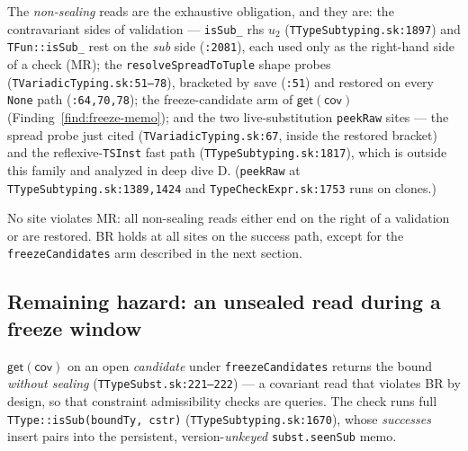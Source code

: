 \documentclass[11pt]{article}
\begin{document}
The \emph{non-sealing} reads are the exhaustive obligation, and they
are: the contravariant sides of validation — \texttt{isSub\_} rhs $u_2$
(\texttt{TTypeSubtyping.sk:1897}) and \texttt{TFun::isSub\_} rest on the
\emph{sub} side (\texttt{:2081}), each used only as the right-hand side
of a check (MR); the \texttt{resolveSpreadToTuple} shape probes
(\texttt{TVariadicTyping.sk:51--78}), bracketed by save
(\texttt{:51}) and restored on every \texttt{None} path
(\texttt{:64,70,78}); the freeze-candidate arm of
$\mathsf{get}(\mathsf{cov})$ (Finding~\ref{find:freeze-memo}); and the
two live-substitution \texttt{peekRaw} sites — the spread probe just
cited (\texttt{TVariadicTyping.sk:67}, inside the restored bracket) and
the reflexive-\texttt{TSInst} fast path
(\texttt{TTypeSubtyping.sk:1817}), which is outside this family and
analyzed in deep dive D. (\texttt{peekRaw} at
\texttt{TTypeSubtyping.sk:1389,1424} and \texttt{TypeCheckExpr.sk:1753}
runs on clones.)

No site violates MR: all non-sealing reads either end on the right of a
validation or are restored. BR holds at all sites on the success path,
except for the \texttt{freezeCandidates} arm described in the next section.

\subsection{Remaining hazard: an unsealed read during a freeze window}
\label{sec:freeze-hazard}

$\mathsf{get}(\mathsf{cov})$ on an open \emph{candidate} under
\texttt{freezeCandidates} returns the bound \emph{without sealing}
(\texttt{TTypeSubst.sk:221--222}) — a covariant read that violates BR by
design, so that constraint admissibility checks are queries. The check
runs full \texttt{TType::isSub(boundTy, cstr)}
(\texttt{TTypeSubtyping.sk:1670}), whose \emph{successes} insert pairs
into the persistent, version-\emph{unkeyed} \texttt{subst.seenSub} memo.
\end{document}
